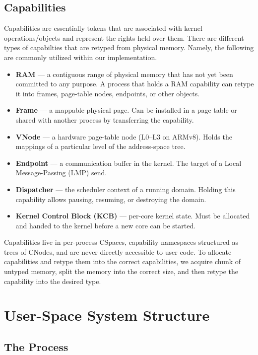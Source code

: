 \subsection{Capabilities}

Capabilities are essentially tokens that are associated with kernel operations/objects
and represent the rights held over them. There are different types of capabilties that
are retyped from physical memory. Namely, the following are commonly utilized within
our implementation.

\begin{itemize}[nosep]
  \item \textbf{RAM} --- a contiguous range of physical memory that has not yet
        been committed to any purpose.  A process that holds a RAM capability
        can retype it into frames, page-table nodes, endpoints, or other objects.
  \item \textbf{Frame} --- a mappable physical page. Can be installed in a page
        table or shared with another process by transferring the capability.
  \item \textbf{VNode} --- a hardware page-table node (L0--L3 on ARMv8). Holds
        the mappings of a particular level of the address-space tree.
  \item \textbf{Endpoint} --- a communication buffer in the kernel. The target
        of a Local Message-Passing (LMP) send.
  \item \textbf{Dispatcher} --- the scheduler context of a running domain.
        Holding this capability allows pausing, resuming, or destroying the
        domain.
  \item \textbf{Kernel Control Block (KCB)} --- per-core kernel state. Must be
        allocated and handed to the kernel before a new core can be started.
\end{itemize}

\medskip\noindent
Capabilities live in per-process CSpaces, capability namespaces
structured as trees of CNodes, and are never directly accessible to user code.
To allocate capabilities and retype them into the correct capabilities, we acquire
chunk of untyped memory, split the memory into the correct size, and then retype the
capability into the desired type.


\section{User-Space System Structure}


\subsection{The  Process}

